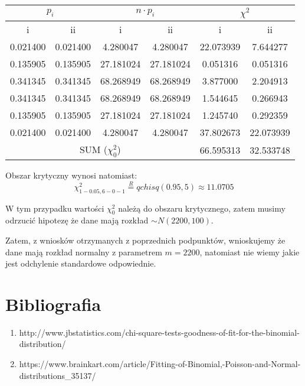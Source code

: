 \documentclass{article}
\begin{document}
\begin{center} \begin{tabular}{|c|c|c|c|c|c|} \hline
\multicolumn{2}{|c|}{$p_i$} & \multicolumn{2}{|c|}{$n \cdot p_i$} & \multicolumn{2}{|c|}{$\chi^2$} \\ \hline
i & ii & i & ii & i & ii \\ \hline
0.021400 & 0.021400 & 4.280047 & 4.280047 & 22.073939 & 7.644277 \\ \hline
0.135905 & 0.135905 & 27.181024 & 27.181024 & 0.051316 & 0.051316 \\ \hline
0.341345 & 0.341345 & 68.268949 & 68.268949 & 3.877000 & 2.204913 \\ \hline
0.341345 & 0.341345 & 68.268949 & 68.268949 & 1.544645 & 0.266943 \\ \hline
0.135905 & 0.135905 & 27.181024 & 27.181024 & 1.245740 & 0.292359 \\ \hline
0.021400 & 0.021400 & 4.280047 & 4.280047 & 37.802673 & 22.073939 \\ \hline		
\multicolumn{4}{|c|}{SUM ($\chi^2_0$)} & 66.595313	& 32.533748 \\ \hline
\end{tabular} \end{center}

Obszar krytyczny wynosi natomiast:
\[ \chi^2_{1-0.05,6-0-1} \overset{R}{=} qchisq(0.95, 5) \approx 11.0705 \]

W tym przypadku wartości $\chi^2_0$ należą do obszaru krytycznego, zatem musimy odrzucić hipotezę że dane mają rozkład $\sim N(2200, 100)$. \\ \par

Zatem, z wniosków otrzymanych z poprzednich podpunktów, wnioskujemy że dane mają rozkład normalny z parametrem $m = 2200$, natomiast nie wiemy jakie jest odchylenie standardowe odpowiednie.

\newpage
\section{Bibliografia}
\begin{enumerate}[ label = (\arabic*)]
\item http://www.jbstatistics.com/chi-square-tests-goodness-of-fit-for-the-binomial-distribution/
\item https://www.brainkart.com/article/Fitting-of-Binomial,-Poisson-and-Normal-distributions\_35137/
\end{enumerate}
\end{document}
